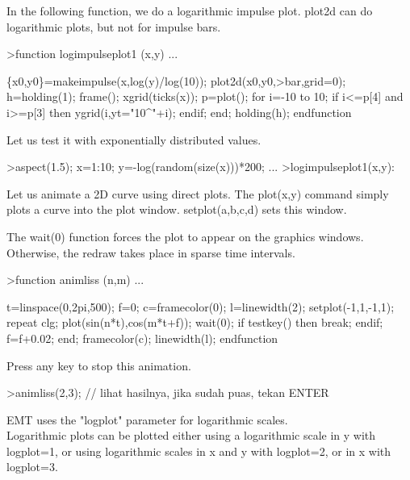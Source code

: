 \documentclass[a4paper,10pt]{article}
\begin{document}
\begin{eulernotebook}
\begin{eulercomment}
\begin{eulercomment}
\begin{eulercomment}
\begin{eulercomment}
\begin{eulercomment}
In the following function, we do a logarithmic impulse plot. plot2d can do logarithmic
plots, but not for impulse bars.
\end{eulercomment}
\begin{eulerprompt}
>function logimpulseplot1 (x,y) ...
\end{eulerprompt}
\begin{eulerudf}
    \{x0,y0\}=makeimpulse(x,log(y)/log(10));
    plot2d(x0,y0,>bar,grid=0);
    h=holding(1);
    frame();
    xgrid(ticks(x));
    p=plot();
    for i=-10 to 10;
      if i<=p[4] and i>=p[3] then
         ygrid(i,yt="10^"+i);
      endif;
    end;
    holding(h);
  endfunction
\end{eulerudf}
\begin{eulercomment}
Let us test it with exponentially distributed values.
\end{eulercomment}
\begin{eulerprompt}
>aspect(1.5); x=1:10; y=-log(random(size(x)))*200; ...
>logimpulseplot1(x,y):
\end{eulerprompt}
\begin{eulercomment}
Let us animate a 2D curve using direct plots. The plot(x,y) command
simply plots a curve into the plot window. setplot(a,b,c,d) sets this
window.

The wait(0) function forces the plot to appear on the graphics
windows. Otherwise, the redraw takes place in sparse time intervals.
\end{eulercomment}
\begin{eulerprompt}
>function animliss (n,m) ...
\end{eulerprompt}
\begin{eulerudf}
  t=linspace(0,2pi,500);
  f=0;
  c=framecolor(0);
  l=linewidth(2);
  setplot(-1,1,-1,1);
  repeat
    clg;
    plot(sin(n*t),cos(m*t+f));
    wait(0);
    if testkey() then break; endif;
    f=f+0.02;
  end;
  framecolor(c);
  linewidth(l);
  endfunction
\end{eulerudf}
\begin{eulercomment}
Press any key to stop this animation.
\end{eulercomment}
\begin{eulerprompt}
>animliss(2,3); // lihat hasilnya, jika sudah puas, tekan ENTER
\end{eulerprompt}
\begin{eulercomment}
EMT uses the "logplot" parameter for logarithmic scales.\\
Logarithmic plots can be plotted either using a logarithmic scale in y with logplot=1,
or using logarithmic scales in x and y with logplot=2, or in x with logplot=3.


\end{eulercomment}
\end{eulercomment}
\end{eulercomment}
\end{eulercomment}
\end{eulercomment}
\end{eulernotebook}
\end{document}
